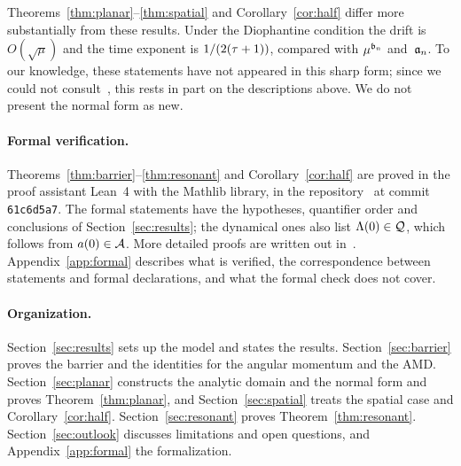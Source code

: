 Theorems~\ref{thm:planar}--\ref{thm:spatial} and Corollary~\ref{cor:half} differ more substantially from these results. Under the Diophantine condition the drift is $O(\sqrt\mu)$ and the time exponent is $1/(2(\tau+1))$, compared with $\mu^{\mathfrak{b}_n{}}$ and~$\mathfrak{a}_n{}$. To our knowledge, these statements have not appeared in this sharp form; since we could not consult~\cite{Nie96}, this rests in part on the descriptions above. We do not present the normal form as new.

\paragraph{Formal verification.} Theorems~\ref{thm:barrier}--\ref{thm:resonant} and Corollary~\ref{cor:half} are proved in the proof assistant Lean~4 with the Mathlib library, in the repository~\cite{KAMrepo} at commit \texttt{61c6d5a7}. The formal statements have the hypotheses, quantifier order and conclusions of Section~\ref{sec:results}; the dynamical ones also list $\Lambda(0)\in\mathcal{Q}$, which follows from $a(0)\in\mathcal{A}$. More detailed proofs are written out in~\cite{KAMnotes}. Appendix~\ref{app:formal} describes what is verified, the correspondence between statements and formal declarations, and what the formal check does not cover.

\paragraph{Organization.} Section~\ref{sec:results} sets up the model and states the results. Section~\ref{sec:barrier} proves the barrier and the identities for the angular momentum and the AMD. Section~\ref{sec:planar} constructs the analytic domain and the normal form and proves Theorem~\ref{thm:planar}, and Section~\ref{sec:spatial} treats the spatial case and Corollary~\ref{cor:half}. Section~\ref{sec:resonant} proves Theorem~\ref{thm:resonant}. Section~\ref{sec:outlook} discusses limitations and open questions, and Appendix~\ref{app:formal} the formalization.
